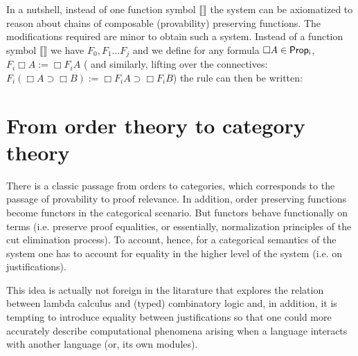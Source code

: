 In a nutshell, instead 
of one function symbol $\llbracket \rrbracket$ 
the system can 
be axiomatized to reason about chains of 
composable (provability) preserving functions. 
The modifications required are minor to obtain such a system.
Instead of a function symbol $\llbracket \rrbracket$ we have $F_0, F_1\ldots F_j$ and we 
define for any formula $\Box A\in {\sf Prop_i}$, 
$F_i\Box A:= \Box F_i A$ (
    and similarly, lifting over the connectives: 
$F_i(\Box A\supset \Box B):= \Box F_i A\supset\Box F_i B$)
the rule can then be written:





\section{From order theory to category theory}

There is a classic passage from orders to categories, 
which corresponds to the passage of provability to 
proof relevance. In addition, order preserving functions become 
functors in the categorical scenario. But functors behave functionally
on terms (i.e. preserve proof equalities, or essentially, normalization principles of the cut elimination process).
To account, hence, for 
a categorical semantics of the system one has to account for equality
in the higher level of the system (i.e. on justifications).

This idea is actually not foreign in the litarature that explores the relation
between lambda calculus and (typed) combinatory logic and, in addition,
it is tempting to introduce equality between justifications so that one
could more accurately describe computational phenomena arising when 
a language interacts with another language (or, its own modules).

